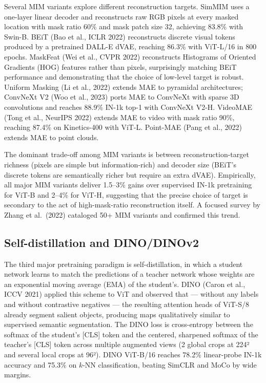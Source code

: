 Several MIM variants explore different reconstruction targets. SimMIM uses a one-layer linear decoder and reconstructs raw RGB pixels at every masked location with mask ratio 60\% and mask patch size 32, achieving 83.8\% with Swin-B. BEiT (Bao et al., ICLR 2022) reconstructs discrete visual tokens produced by a pretrained DALL-E dVAE, reaching 86.3\% with ViT-L/16 in 800 epochs. MaskFeat (Wei et al., CVPR 2022) reconstructs Histograms of Oriented Gradients (HOG) features rather than pixels, surprisingly matching BEiT performance and demonstrating that the choice of low-level target is robust. Uniform Masking (Li et al., 2022) extends MAE to pyramidal architectures; ConvNeXt V2 (Woo et al., 2023) ports MAE to ConvNeXt with sparse 3D convolutions and reaches 88.9\% IN-1k top-1 with ConvNeXt V2-H. VideoMAE (Tong et al., NeurIPS 2022) extends MAE to video with mask ratio 90\%, reaching 87.4\% on Kinetics-400 with ViT-L. Point-MAE (Pang et al., 2022) extends MAE to point clouds.

The dominant trade-off among MIM variants is between reconstruction-target richness (pixels are simple but information-rich) and decoder size (BEiT's discrete tokens are semantically richer but require an extra dVAE). Empirically, all major MIM variants deliver 1.5--3\% gains over supervised IN-1k pretraining for ViT-B and 2--4\% for ViT-H, suggesting that the precise choice of target is secondary to the act of high-mask-ratio reconstruction itself. A focused survey by Zhang et al.~(2022) cataloged 50+ MIM variants and confirmed this trend.

\subsection{Self-distillation and DINO/DINOv2}\label{self-distillation-and-dinodinov2}

The third major pretraining paradigm is self-distillation, in which a student network learns to match the predictions of a teacher network whose weights are an exponential moving average (EMA) of the student's. DINO (Caron et al., ICCV 2021) applied this scheme to ViT and observed that --- without any labels and without contrastive negatives --- the resulting attention heads of ViT-S/8 already segment salient objects, producing maps qualitatively similar to supervised semantic segmentation. The DINO loss is cross-entropy between the softmax of the student's {[}CLS{]} token and the centered, sharpened softmax of the teacher's {[}CLS{]} token across multiple augmented views (2 global crops at 224² and several local crops at 96²). DINO ViT-B/16 reaches 78.2\% linear-probe IN-1k accuracy and 75.3\% on \(k\)-NN classification, beating SimCLR and MoCo by wide margins.

